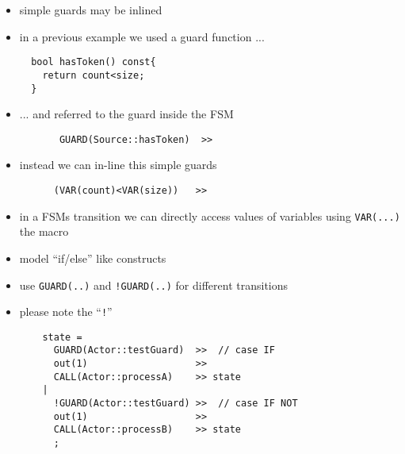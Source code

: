 \begin{frame}[fragile=singleslide]
\begin{itemize}
\item simple guards may be inlined
\item in a previous example we used a guard function ...
\begin{lstlisting}
  bool hasToken() const{
    return count<size;
  }
\end{lstlisting}
\item ... and referred to the guard inside the FSM 
\begin{lstlisting}
       GUARD(Source::hasToken)  >>
\end{lstlisting}
\item instead we can in-line this simple guards
\begin{lstlisting}
      (VAR(count)<VAR(size))   >>
\end{lstlisting}
\item in a FSMs transition we can directly access values of variables using \lstinline!VAR(...)! the macro
\end{itemize}
\end{frame}





\begin{frame}[fragile=singleslide]
\begin{itemize}
\item model ``if/else'' like constructs
\item use \lstinline|GUARD(..)| and  \lstinline|!GUARD(..)| for different transitions
\item please note the ``\lstinline|!|''
\begin{lstlisting}
    state = 
      GUARD(Actor::testGuard)  >>  // case IF
      out(1)                   >>
      CALL(Actor::processA)    >> state
    |
      !GUARD(Actor::testGuard) >>  // case IF NOT
      out(1)                   >>
      CALL(Actor::processB)    >> state
      ;
\end{lstlisting}
\end{itemize}
\end{frame}





